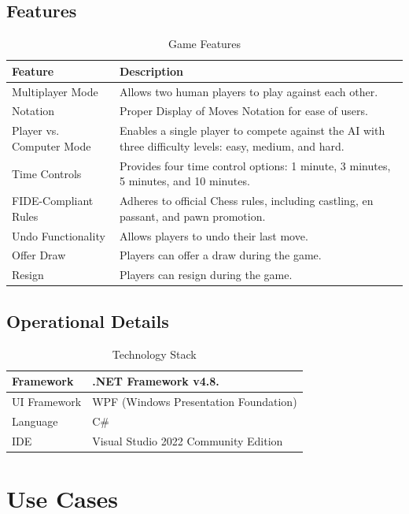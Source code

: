 \documentclass[a4paper,12pt]{article}
\begin{document}
\subsection{Features}
\begin{longtable}{|p{}|p{}|}
    \caption{Game Features}
    \hline
    \textbf{Feature} & \textbf{Description} \\
    \hline
    Multiplayer Mode & Allows two human players to play against each other. \\
    \hline
    Notation & Proper Display of Moves Notation for ease of users. \\
    \hline
    Player vs. Computer Mode & Enables a single player to compete against the AI with three difficulty levels: easy, medium, and hard. \\
    \hline
    Time Controls & Provides four time control options: 1 minute, 3 minutes, 5 minutes, and 10 minutes. \\
    \hline
    FIDE-Compliant Rules & Adheres to official Chess rules, including castling, en passant, and pawn promotion. \\
    \hline
    Undo Functionality & Allows players to undo their last move. \\
    \hline
    Offer Draw & Players can offer a draw during the game. \\
    \hline
    Resign & Players can resign during the game. \\
    \hline
\end{longtable}

\subsection{Operational Details}
\begin{longtable}{|p{}|p{}|}
    \caption{Technology Stack}
    \hline
    Framework & .NET Framework v4.8. \\
    \hline
    UI Framework & WPF (Windows Presentation Foundation)   \\
    \hline
    Language & C\# \\
    \hline
    IDE & Visual Studio 2022 Community Edition \\
    \hline
\end{longtable}

\section{Use Cases}
\end{document}
